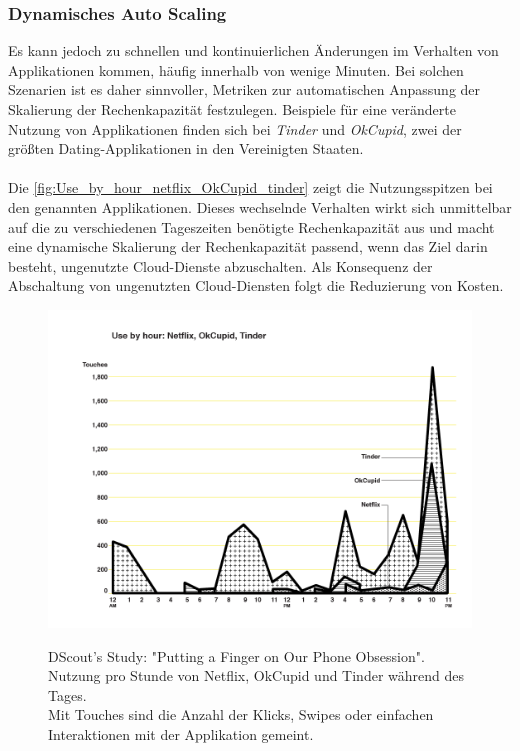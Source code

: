 \subsubsection{Dynamisches Auto Scaling}
Es kann jedoch zu schnellen und kontinuierlichen Änderungen im Verhalten von Applikationen kommen, häufig innerhalb von wenige Minuten. Bei solchen Szenarien ist es daher sinnvoller, Metriken zur automatischen Anpassung der Skalierung der Rechenkapazität festzulegen. Beispiele für eine veränderte Nutzung von Applikationen finden sich bei \textit{Tinder} und \textit{OkCupid}, zwei der größten Dating-Applikationen in den Vereinigten Staaten. 
\\\\
Die \autoref{fig:Use_by_hour_netflix_OkCupid_tinder} zeigt die Nutzungsspitzen bei den genannten Applikationen. Dieses wechselnde Verhalten wirkt sich unmittelbar auf die zu verschiedenen Tageszeiten benötigte Rechenkapazität aus und macht eine dynamische Skalierung der Rechenkapazität passend, wenn das Ziel darin besteht, ungenutzte Cloud-Dienste abzuschalten. Als Konsequenz der Abschaltung von ungenutzten Cloud-Diensten folgt die Reduzierung von Kosten.
\begin{figure}[h!]
  \centering
  \includegraphics[scale=0.4]{sources/Use_by_hour_netflix_OkCupid_tinder}
  \caption[Nutzung von Tinder, OkCupid und Netflix pro Stunde]{}\label{fig:Use_by_hour_netflix_OkCupid_tinder} 
  DScout's Study: "Putting a Finger on Our Phone Obsession". \\
  Nutzung pro Stunde von Netflix, OkCupid und Tinder während des Tages\cite{SCOUT1}.
  \\Mit Touches sind die Anzahl der Klicks, Swipes oder einfachen Interaktionen mit der Applikation gemeint.
\end{figure}
